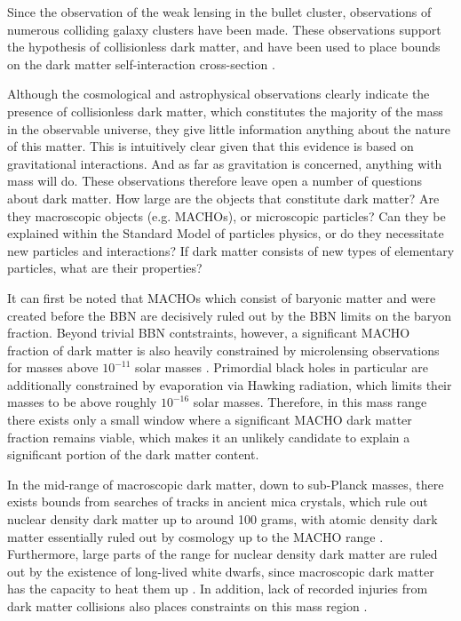 \documentclass[b5paper, 10pt, twoside]{book}
\begin{document}
Since the observation of the weak lensing in the bullet cluster, observations of numerous colliding galaxy clusters have been made. These observations support the hypothesis of collisionless dark matter, and have been used to place bounds on the dark matter self-interaction cross-section \parencite{HarveyEtAl2015}.

Although the cosmological and astrophysical observations clearly indicate the presence of collisionless dark matter, which constitutes the majority of the mass in the observable universe, they give little information anything about the nature of this matter. This is intuitively clear given that this evidence is based on gravitational interactions. And as far as gravitation is concerned, anything with mass will do. These observations therefore leave open a number of questions about dark matter. How large are the objects that constitute dark matter? Are they macroscopic objects (e.g. MACHOs), or microscopic particles? Can they be explained within the Standard Model of particles physics, or do they necessitate new particles and interactions? If dark matter consists of new types of elementary particles, what are their properties?

It can first be noted that MACHOs which consist of baryonic matter and were created before the BBN are decisively ruled out by the BBN limits on the baryon fraction. Beyond trivial BBN contstraints, however, a significant MACHO fraction of dark matter is also heavily constrained by microlensing observations for masses above $10^{-11}$ solar masses \parencite{BirdEtAl2023}. Primordial black holes in particular are additionally constrained by evaporation via Hawking radiation, which limits their masses to be above roughly $10^{-16}$ solar masses. Therefore, in this mass range there exists only a small window where a significant MACHO dark matter fraction remains viable, which makes it an unlikely candidate to explain a significant portion of the dark matter content.

In the mid-range of macroscopic dark matter, down to sub-Planck masses, there exists bounds from searches of tracks in ancient mica crystals, which rule out nuclear density dark matter up to around 100 grams, with atomic density dark matter essentially ruled out by cosmology up to the MACHO range \parencite{JacobsStarkmanLynn2015}. Furthermore, large parts of the range for nuclear density dark matter are ruled out by the existence of long-lived white dwarfs, since macroscopic dark matter has the capacity to heat them up \parencite{Graham2018}. In addition, lack of recorded injuries from dark matter collisions also places constraints on this mass region \parencite{SidhuScherrerStarkman2020}.
\end{document}
